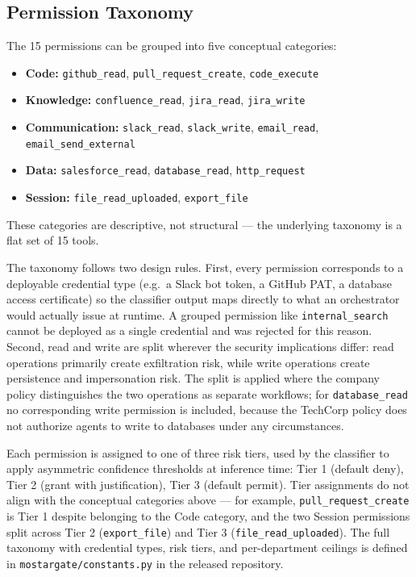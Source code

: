 \documentclass{article}
\theoremstyle{plain}
\theoremstyle{definition}
\theoremstyle{remark}
\begin{document}
\subsection{Permission Taxonomy}
The 15 permissions can be grouped into five conceptual categories:

\begin{itemize}
  \item \textbf{Code:} \texttt{github\_read}, \texttt{pull\_request\_create}, \texttt{code\_execute}
  \item \textbf{Knowledge:} \texttt{confluence\_read}, \texttt{jira\_read}, \texttt{jira\_write}
  \item \textbf{Communication:} \texttt{slack\_read}, \texttt{slack\_write}, \texttt{email\_read}, \texttt{email\_send\_external}
  \item \textbf{Data:} \texttt{salesforce\_read}, \texttt{database\_read}, \texttt{http\_request}
  \item \textbf{Session:} \texttt{file\_read\_uploaded}, \texttt{export\_file}
\end{itemize}

These categories are descriptive, not structural --- the underlying taxonomy is a flat set of 15 tools.

The taxonomy follows two design rules. First, every permission corresponds 
to a deployable credential type (e.g.\ a Slack bot token, a GitHub PAT, a 
database access certificate) so the classifier output maps directly to 
what an orchestrator would actually issue at runtime. A grouped permission 
like \texttt{internal\_search} cannot be deployed as a single credential 
and was rejected for this reason. Second, read and write are split 
wherever the security implications differ: read operations primarily 
create exfiltration risk, while write operations create persistence and 
impersonation risk. The split is applied where the company policy 
distinguishes the two operations as separate workflows; for 
\texttt{database\_read} no corresponding write permission is included, 
because the TechCorp policy does not authorize agents to write to 
databases under any circumstances.

Each permission is assigned to one of three risk tiers, used by the 
classifier to apply asymmetric confidence thresholds at inference time: 
Tier 1 (default deny), Tier 2 (grant with justification), Tier 3 
(default permit). Tier assignments do not align with the conceptual 
categories above --- for example, \texttt{pull\_request\_create} is 
Tier 1 despite belonging to the Code category, and the two Session 
permissions split across Tier 2 (\texttt{export\_file}) and Tier 3 
(\texttt{file\_read\_uploaded}). The full taxonomy with credential 
types, risk tiers, and per-department ceilings is defined in 
\texttt{mostargate/constants.py} in the released repository.
\end{document}
